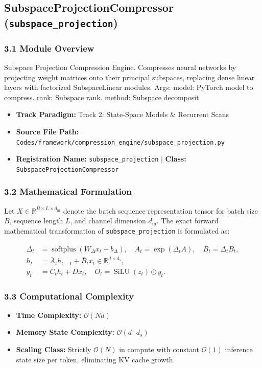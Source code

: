\subsection{SubspaceProjectionCompressor (\texttt{subspace\_projection})}
\label{sec:app_module_subspace_projection}

\subsubsection*{3.1 Module Overview}
Subspace Projection Compression Engine. Compresses neural networks by projecting weight matrices onto their principal subspaces, replacing dense linear layers with factorized SubspaceLinear modules.  Args:     model: PyTorch model to compress.     rank: Subspace rank.     method: Subspace decomposit
\begin{itemize}
    \item \textbf{Track Paradigm:} Track 2: State-Space Models & Recurrent Scans
    \item \textbf{Source File Path:} \texttt{Codes/framework/compression\_engine/subspace\_projection.py}
    \item \textbf{Registration Name:} \texttt{subspace\_projection} $\mid$ \textbf{Class:} \texttt{SubspaceProjectionCompressor}
\end{itemize}

\subsubsection*{3.2 Mathematical Formulation}
Let $X \in \mathbb{R}^{B \times L \times d_{\text{in}}}$ denote the batch sequence representation tensor for batch size $B$, sequence length $L$, and channel dimension $d_{\text{in}}$. The exact forward mathematical transformation of \texttt{subspace\_projection} is formulated as:

\begin{align}
\Delta_t &= \operatorname{softplus}(W_\Delta x_t + b_\Delta), \quad \bar{A}_t = \exp(\Delta_t A), \quad \bar{B}_t = \Delta_t B_t, \\
h_t &= \bar{A}_t h_{t-1} + \bar{B}_t x_t \in \mathbb{R}^{d \times d_s}, \\
y_t &= C_t h_t + D x_t, \quad O_t = \operatorname{SiLU}(z_t) \odot y_t.
\end{align}


\subsubsection*{3.3 Computational Complexity}
\begin{itemize}
    \item \textbf{Time Complexity:} $\mathcal{O}(N d)$
    \item \textbf{Memory State Complexity:} $\mathcal{O}(d \cdot d_s)$
    \item \textbf{Scaling Class:} Strictly $\mathcal{O}(N)$ in compute with constant $\mathcal{O}(1)$ inference state size per token, eliminating KV cache growth.
\end{itemize}

